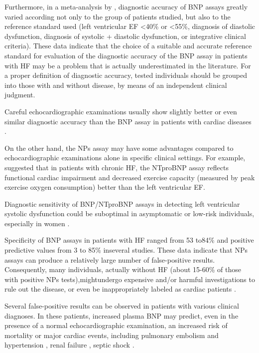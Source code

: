\documentclass[14pt,a4paper,onecolumn]{extarticle}
\begin{document}
Furthermore, in a meta-analysis by \citep{bib372}, diagnostic accuracy of BNP assays greatly varied according not only to the group of patients studied, but also to the reference standard used (left ventricular EF <40\% or <55\%, diagnosis of diastolic dysfunction, diagnosis of systolic + diastolic dysfunction, or integrative clinical criteria). These data indicate that the choice of a suitable and accurate reference standard for evaluation of the diagnostic accuracy of the BNP assay in patients with HF may be a problem that is actually underestimated in the literature. For a proper definition of diagnostic accuracy, tested individuals should be grouped into those with and without disease, by means of an independent clinical judgment.

Careful echocardiographic examinations usually show slightly better or even similar diagnostic accuracy than the BNP assay in patients with cardiac diseases \citep{bib3178}.

On the other hand, the NPs assay may have some advantages compared to echocardiographic examinations alone in specific clinical settings. For example, \citep{bib375} suggested that in patients with chronic HF, the NTproBNP assay reflects functional cardiac impairment and decreased exercise capacity (measured by peak exercise oxygen consumption) better than the left ventricular EF.

Diagnostic sensitivity of BNP/NTproBNP assays in detecting left ventricular systolic dysfunction could be suboptimal in asymptomatic or low-risk individuals, especially in women \citep{bib39}.

Specificity of BNP assays in patients with HF ranged from 53 to84\% and positive predictive values from 3 to 85\% inseveral studies. These data indicate that NPs assays can produce a relatively large number of false-positive results. Consequently, many individuals, actually without HF (about 15-60\% of those with positive NPs tests),mightundergo expensive and/or harmful investigations to rule out the disease, or even be inappropriately labeled as cardiac patients \citep{bib35}.

Several false-positive results can be observed in patients with various clinical diagnoses. In these patients, increased plasma BNP may predict, even in the presence of a normal echocardiographic examination, an increased risk of mortality or major cardiac events, including pulmonary embolism \citep{121} \citep{123} \citep{bib382} and hypertension \citep{bib383}, renal failure \citep{bib384} \citep{bib385}, septic shock \citep{bib386}.
\end{document}
